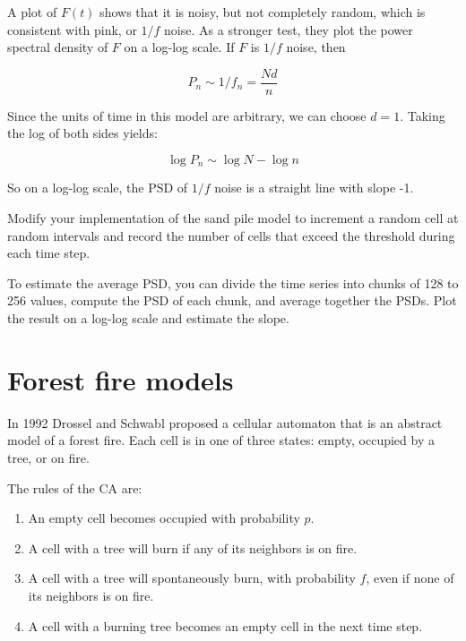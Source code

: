 \documentclass[10pt]{book}
\begin{document}
A plot of $F(t)$ shows that it is noisy, but not completely
random, which is consistent with pink, or $1/f$ noise.
As a stronger test, they plot the power spectral density of
$F$ on a log-log scale.  If $F$ is $1/f$ noise, then

\[ P_n \sim 1 / f_n = \frac{N d}{n} \]

Since the units of time in this model are arbitrary, we
can choose $d=1$.  Taking the log of both sides yields:

\[ \log P_n \sim \log N - \log n \]

So on a log-log scale, the PSD of $1/f$ noise is a straight
line with slope -1.

\begin{ex}

Modify your implementation of the sand pile model to increment
a random cell at random intervals and record the number of cells
that exceed the threshold during each time step.

To estimate the average PSD, you can divide the time series into
chunks of 128 to 256 values, compute the PSD of each chunk, and
average together the PSDs.  Plot the result on a log-log scale
and estimate the slope.

\end{ex}


\section{Forest fire models}

In 1992 Drossel and Schwabl proposed a cellular automaton that is
an abstract model of a forest fire.  Each cell is in one of three
states: empty, occupied by a tree, or on fire.

The rules of the CA are:

\begin{enumerate}

\item An empty cell becomes occupied with probability $p$.

\item A cell with a tree will burn if any of its neighbors
  is on fire.

\item A cell with a tree will spontaneously burn, with
  probability $f$, even if none of its neighbors is on fire.

\item A cell with a burning tree becomes an empty cell in the next
  time step.

\end{enumerate}
\end{document}
